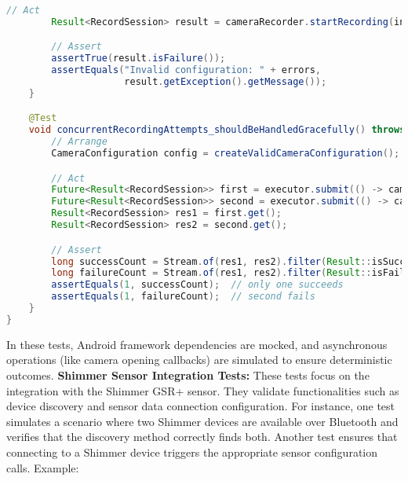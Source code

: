 \documentclass[11pt,a4paper]{report}
\begin{document}
\begin{lstlisting}[language=Java]
        // Act  
        Result<RecordSession> result = cameraRecorder.startRecording(invalidConfig);  

        // Assert  
        assertTrue(result.isFailure());  
        assertEquals("Invalid configuration: " + errors,  
                     result.getException().getMessage());  
    }

    @Test
    void concurrentRecordingAttempts_shouldBeHandledGracefully() throws Exception {  
        // Arrange  
        CameraConfiguration config = createValidCameraConfiguration();  

        // Act  
        Future<Result<RecordSession>> first = executor.submit(() -> cameraRecorder.startRecording(config));  
        Future<Result<RecordSession>> second = executor.submit(() -> cameraRecorder.startRecording(config));  
        Result<RecordSession> res1 = first.get();  
        Result<RecordSession> res2 = second.get();  

        // Assert  
        long successCount = Stream.of(res1, res2).filter(Result::isSuccess).count();  
        long failureCount = Stream.of(res1, res2).filter(Result::isFailure).count();  
        assertEquals(1, successCount);  // only one succeeds  
        assertEquals(1, failureCount);  // second fails  
    }  
}
\end{lstlisting}
In these tests, Android framework dependencies are mocked, and asynchronous operations (like camera opening callbacks) are simulated to ensure deterministic outcomes.
\textbf{Shimmer Sensor Integration Tests:} These tests focus on the integration with the Shimmer GSR+ sensor. They validate functionalities such as device discovery and sensor data connection configuration. For instance, one test simulates a scenario where two Shimmer devices are available over Bluetooth and verifies that the discovery method correctly finds both. Another test ensures that connecting to a Shimmer device triggers the appropriate sensor configuration calls. Example:
\end{document}
